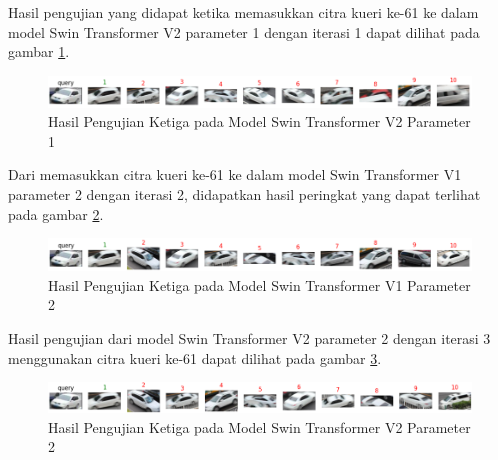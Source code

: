 Hasil pengujian yang didapat ketika memasukkan citra kueri ke-61 ke dalam model Swin Transformer V2 parameter 1 dengan 
iterasi 1 dapat dilihat pada gambar \ref{fig:hasilpengujianketigapadamodelswintransformerv2param1}.

\begin{figure}[h!]
  \centering
  \includegraphics[scale=0.6]{gambar/Que61V2P1IT1.png}
  \caption{Hasil Pengujian Ketiga pada Model Swin Transformer V2 Parameter 1}
  \label{fig:hasilpengujianketigapadamodelswintransformerv2param1}
\end{figure}

Dari memasukkan citra kueri ke-61 ke dalam model Swin Transformer V1 parameter 2 dengan iterasi 2, didapatkan hasil 
peringkat yang dapat terlihat pada gambar \ref{fig:hasilpengujianketigapadamodelswintransformerv1param2}.

\begin{figure}[h!]
  \centering
  \includegraphics[scale=0.6]{gambar/Que61V1P2IT2.png}
  \caption{Hasil Pengujian Ketiga pada Model Swin Transformer V1 Parameter 2}
  \label{fig:hasilpengujianketigapadamodelswintransformerv1param2}
\end{figure}

Hasil pengujian dari model Swin Transformer V2 parameter 2 dengan iterasi 3 menggunakan citra kueri ke-61 dapat 
dilihat pada gambar \ref{fig:hasilpengujianketigapadamodelswintransformerv2param2}.

\begin{figure}[h!]
  \centering
  \includegraphics[scale=0.6]{gambar/Que61V2P2IT3.png}
  \caption{Hasil Pengujian Ketiga pada Model Swin Transformer V2 Parameter 2}
  \label{fig:hasilpengujianketigapadamodelswintransformerv2param2}
\end{figure}

